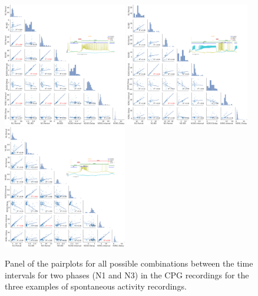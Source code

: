 \begin{figure}[htbp]
	\centering
	\includegraphics[width=0.48\textwidth]{./img/invariants/data/SUSSEX/prep2/images/2phases/panel_with_pairplot.pdf}
	\includegraphics[width=0.48\textwidth]{./img/invariants/data/SUSSEX/prep3/images/2phases/panel_with_pairplot.pdf}
	\includegraphics[width=0.48\textwidth]{./img/invariants/data/SUSSEX/prep1/images/2phases/panel_with_pairplot.pdf}
	\caption{Panel of the pairplots for all possible combinations between the time intervals for two phases (N1 and N3) in the CPG recordings for the three examples of spontaneous activity recordings.}
	\label{fig:spontaneous pairplot comparison}
\end{figure}


